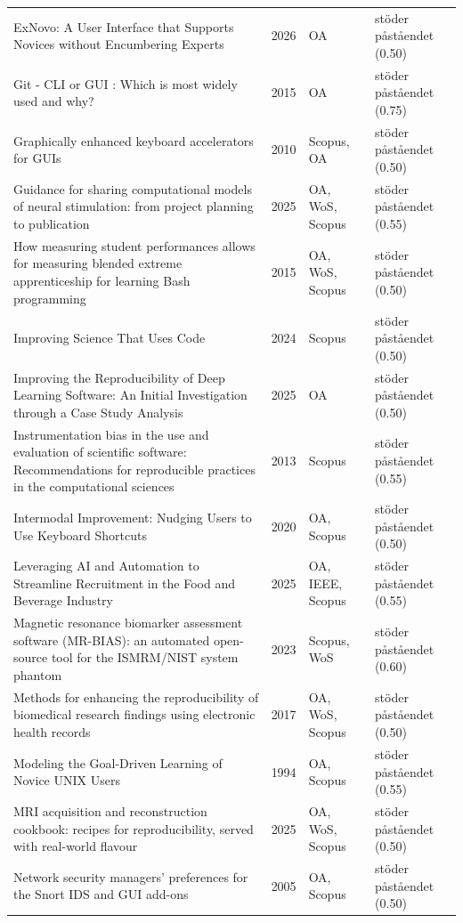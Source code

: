 \begin{longtable}{@{}%
  >{\raggedright\arraybackslash}p{}c%
  >{\raggedright\arraybackslash}p{}%
  >{\raggedright\arraybackslash}p{}@{}}
ExNovo: A User Interface that Supports Novices without Encumbering Experts & 2026 & OA & stöder påståendet (0.50) \\
Git - CLI or GUI : Which is most widely used and why? & 2015 & OA & stöder påståendet (0.75) \\
Graphically enhanced keyboard accelerators for GUIs & 2010 & Scopus, OA & stöder påståendet (0.50) \\
Guidance for sharing computational models of neural stimulation: from project planning to publication & 2025 & OA, WoS, Scopus & stöder påståendet (0.55) \\
How measuring student performances allows for measuring blended extreme apprenticeship for learning Bash programming & 2015 & OA, WoS, Scopus & stöder påståendet (0.50) \\
Improving Science That Uses Code & 2024 & Scopus & stöder påståendet (0.50) \\
Improving the Reproducibility of Deep Learning Software: An Initial Investigation through a Case Study Analysis & 2025 & OA & stöder påståendet (0.50) \\
Instrumentation bias in the use and evaluation of scientific software: Recommendations for reproducible practices in the computational sciences & 2013 & Scopus & stöder påståendet (0.55) \\
Intermodal Improvement: Nudging Users to Use Keyboard Shortcuts & 2020 & OA, Scopus & stöder påståendet (0.50) \\
Leveraging AI and Automation to Streamline Recruitment in the Food and Beverage Industry & 2025 & OA, IEEE, Scopus & stöder påståendet (0.55) \\
Magnetic resonance biomarker assessment software (MR-BIAS): an automated open-source tool for the ISMRM/NIST system phantom & 2023 & Scopus, WoS & stöder påståendet (0.60) \\
Methods for enhancing the reproducibility of biomedical research findings using electronic health records & 2017 & OA, WoS, Scopus & stöder påståendet (0.50) \\
Modeling the Goal-Driven Learning of Novice UNIX Users & 1994 & OA, Scopus & stöder påståendet (0.55) \\
MRI acquisition and reconstruction cookbook: recipes for reproducibility, served with real-world flavour & 2025 & OA, WoS, Scopus & stöder påståendet (0.50) \\
Network security managers' preferences for the Snort IDS and GUI add-ons & 2005 & OA, Scopus & stöder påståendet (0.50) \\

\end{longtable}
